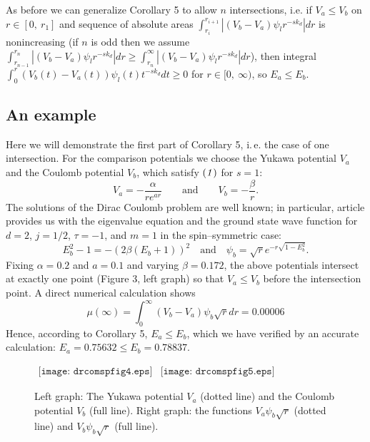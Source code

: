 \documentclass[amsmath,amssymb,superscriptaddress,showkeys, showpacs, aps, nofootinbib]{revtex4}
\begin{document}
\medskip

As before we can generalize Corollary 5 to allow $n$ intersections, i.e. if $V_a\le V_b$ on $r\in[0,\ r_1]$ and sequence of absolute areas $\int_{r_i}^{r_{i+1}}|(V_b-V_a)\psi_{l}r^{-sk_d}|dr$ is nonincreasing (if $n$ is odd then we assume $\int_{r_{n-1}}^{r_n}|(V_b-V_a)\psi_{l}r^{-sk_d}|dr\ge\int_{r_n}^\infty|(V_b-V_a)
\psi_{l}r^{-sk_d}|dr$), then integral $\int_0^r (V_b(t)-V_a(t))\psi_{l}(t)t^{-sk_d}dt\ge 0$ for $r\in[0,\ \infty)$, so $E_a\le E_b$.

\subsection{An example}
Here we will demonstrate the first part of Corollary 5, i.\,e. the case of one intersection. For the comparison potentials we choose the Yukawa potential \cite{Yuk} $V_a$ and the Coulomb potential $V_b$, which satisfy ${\it (1)}$ for $s=1$:  
\begin{equation*}
V_a=-\frac{\alpha}{re^{ar}} \qquad \text{and} \qquad 
V_b=-\frac{\beta}{r}.
\end{equation*}
The solutions of the Dirac Coulomb problem are well known; in particular, article \cite{HY} provides us with the eigenvalue equation and the ground state wave function for $d=2$, $j=1/2$, $\tau=-1$, and $m=1$ in the spin--symmetric case:
\begin{equation*}
E_b^2-1=-\left(2\beta(E_b+1)\right)^2 \quad \text{and} \quad
\psi_{b}=\sqrt{r}e^{-r\sqrt{1-E_b^2}}.
\end{equation*} 
Fixing $\alpha=0.2$ and $a=0.1$ and varying $\beta=0.172$, the above potentials intersect at exactly one point (Figure 3, left graph) so that $V_a\le V_b$ before the intersection point.  A direct numerical calculation shows
\begin{equation*}\label{concl5}
\mu(\infty)=\int_0^\infty (V_b-V_a)\psi_{b}\sqrt{r}dr=0.00006
\end{equation*}
Hence, according to Corollary 5, $E_a\le E_b$, which we have verified by an accurate calculation:  $E_a=0.75632\le E_b=0.78837$.
\begin{figure}[ht]
\begin{center}$
\begin{array}{cc}
\texttt{[image: drcomspfig4.eps]} & 
\texttt{[image: drcomspfig5.eps]}
\end{array}$
\end{center}
\caption{Left graph: The Yukawa potential $V_a$ (dotted line) and the Coulomb potential $V_b$ (full line). Right graph:  the functions $V_a\psi_{b}\sqrt{r}$ (dotted line) and $V_b\psi_{b}\sqrt{r}$ (full line).}
\end{figure}
\end{document}
